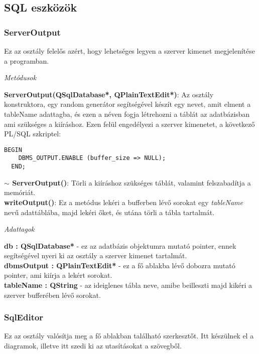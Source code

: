 \subsection{SQL eszközök}

\subsubsection{ServerOutput}

Ez az osztály felelős azért, hogy lehetséges legyen a szerver kimenet megjelenítése a
programban.

\begin{flushleft}
\textit{Metódusok}
\end{flushleft}
\textbf{ServerOutput(QSqlDatabase*, QPlainTextEdit*)}: Az osztály konstruktora, egy random generátor segítségével készít egy nevet, amit elment a tableName adattagba, és ezen a néven fogja létrehozni a táblát az adatbázisban ami szükséges a kiíráshoz. Ezen felül engedélyezi a szerver kimenetet, a következő PL/SQL szkriptel:

\begin{lstlisting}[language=PL/I]
  BEGIN
    DBMS_OUTPUT.ENABLE (buffer_size => NULL);
  END;
\end{lstlisting}
\textbf{$\sim$ ServerOutput()}: Törli a kiíráshoz szükséges táblát, valamint felszabadítja a memóriát. \\
\textbf{writeOutput()}: Ez a metódus lekéri a bufferben lévő sorokat egy \textit{tableName} nevű adattáblába, majd lekéri őket, és utána törli a tábla tartalmát.

\begin{flushleft}
\textit{Adattagok}
\end{flushleft}
\textbf{db : QSqlDatabase*} - ez az adatbázis objektumra mutató pointer, ennek segítségével nyeri ki az osztály a szerver kimenet tartalmát. \\
\textbf{dbmsOutput : QPlainTextEdit*} - ez a fő ablakba lévő dobozra mutató pointer, ami kiírja a lekért sorokat. \\
\textbf{tableName : QString} - az ideiglenes tábla neve, amibe beilleszti majd kikéri a szerver bufferében lévő sorokat.

\subsubsection{SqlEditor}

Ez az osztály valósítja meg a fő ablakban található szerkesztőt. Itt készülnek el a diagramok, illetve itt szedi ki az utasításokat a szövegből.

